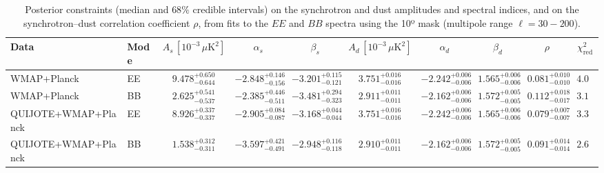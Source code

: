 \begin{table}[h]
\centering
\scriptsize
\setlength{\tabcolsep}{4pt}
\caption{Posterior constraints (median and $68\%$ credible intervals) on the synchrotron and dust amplitudes and spectral indices, and on the synchrotron--dust correlation coefficient $\rho$, from fits to the $EE$ and $BB$ spectra using the 10º mask (multipole range $\ell=30-200$).}
\label{tab:fit_no_QQ_autos_ell30-200}
\begin{tabular}{llcccccccc}
\toprule
Data & Mode & $A_s\,[10^{-3}\,\mu\mathrm{K}^2]$ & $\alpha_s$ & $\beta_s$ & $A_d\,[10^{-3}\,\mu\mathrm{K}^2]$ & $\alpha_d$ & $\beta_d$ & $\rho$ & $\chi^2_\mathrm{red}$ \\
\midrule
WMAP+Planck & EE & $9.478^{+0.650}_{-0.644}$ & $-2.848^{+0.146}_{-0.156}$ & $-3.201^{+0.115}_{-0.121}$ & $3.751^{+0.016}_{-0.016}$ & $-2.242^{+0.006}_{-0.006}$ & $1.565^{+0.006}_{-0.006}$ & $0.081^{+0.010}_{-0.010}$ & $4.05$ \\
WMAP+Planck & BB & $2.625^{+0.541}_{-0.537}$ & $-2.385^{+0.446}_{-0.511}$ & $-3.481^{+0.294}_{-0.323}$ & $2.911^{+0.011}_{-0.011}$ & $-2.162^{+0.006}_{-0.006}$ & $1.572^{+0.005}_{-0.005}$ & $0.112^{+0.018}_{-0.017}$ & $3.12$ \\
QUIJOTE+WMAP+Planck & EE & $8.926^{+0.337}_{-0.337}$ & $-2.905^{+0.084}_{-0.087}$ & $-3.168^{+0.044}_{-0.044}$ & $3.751^{+0.016}_{-0.016}$ & $-2.242^{+0.006}_{-0.006}$ & $1.565^{+0.006}_{-0.006}$ & $0.079^{+0.007}_{-0.007}$ & $3.35$ \\
QUIJOTE+WMAP+Planck & BB & $1.538^{+0.312}_{-0.311}$ & $-3.597^{+0.421}_{-0.491}$ & $-2.948^{+0.116}_{-0.118}$ & $2.910^{+0.011}_{-0.011}$ & $-2.162^{+0.006}_{-0.006}$ & $1.572^{+0.005}_{-0.005}$ & $0.091^{+0.014}_{-0.014}$ & $2.67$ \\
\bottomrule
\end{tabular}
\end{table}